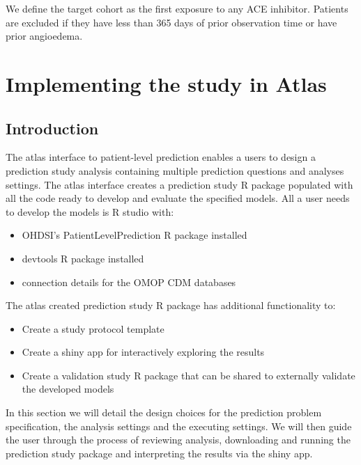 \documentclass[11pt]{book}
\providecommand{\tightlist}{%
  \setlength{\itemsep}{0pt}\setlength{\parskip}{0pt}}
\begin{document}
We define the target cohort as the first exposure to any ACE inhibitor.
Patients are excluded if they have less than 365 days of prior
observation time or have prior angioedema.

\newpage

\section{Implementing the study in
Atlas}\label{implementing-the-study-in-atlas}

\subsection{Introduction}\label{introduction-1}

The atlas interface to patient-level prediction enables a users to
design a prediction study analysis containing multiple prediction
questions and analyses settings. The atlas interface creates a
prediction study R package populated with all the code ready to develop
and evaluate the specified models. All a user needs to develop the
models is R studio with:

\begin{itemize}
\tightlist
\item
  OHDSI's PatientLevelPrediction R package installed
\item
  devtools R package installed
\item
  connection details for the OMOP CDM databases
\end{itemize}

The atlas created prediction study R package has additional
functionality to:

\begin{itemize}
\tightlist
\item
  Create a study protocol template
\item
  Create a shiny app for interactively exploring the results
\item
  Create a validation study R package that can be shared to externally
  validate the developed models
\end{itemize}

In this section we will detail the design choices for the prediction
problem specification, the analysis settings and the executing settings.
We will then guide the user through the process of reviewing analysis,
downloading and running the prediction study package and interpreting
the results via the shiny app.
\end{document}
